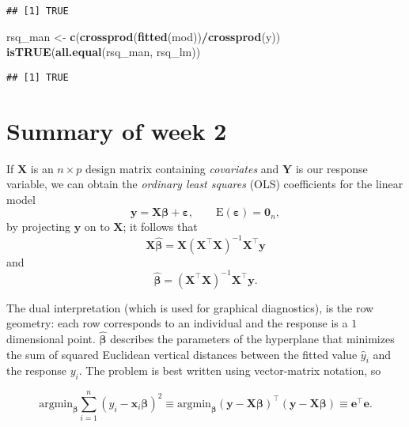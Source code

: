 \documentclass[]{book}
\newenvironment{Shaded}{\begin{snugshade}}{\end{snugshade}}
\newcommand{\KeywordTok}[1]{\textcolor[rgb]{0.13,0.29,0.53}{\textbf{#1}}}
\newcommand{\NormalTok}[1]{#1}
\newcommand{\OperatorTok}[1]{\textcolor[rgb]{0.81,0.36,0.00}{\textbf{#1}}}
\newcommand{\StringTok}[1]{\textcolor[rgb]{0.31,0.60,0.02}{#1}}
\theoremstyle{definition}
\theoremstyle{definition}
\theoremstyle{definition}
\theoremstyle{remark}
\begin{document}
\begin{verbatim}
## [1] TRUE
\end{verbatim}

\begin{Shaded}
\begin{Highlighting}[]
\NormalTok{rsq_man <-}\StringTok{ }\KeywordTok{c}\NormalTok{(}\KeywordTok{crossprod}\NormalTok{(}\KeywordTok{fitted}\NormalTok{(mod))}\OperatorTok{/}\KeywordTok{crossprod}\NormalTok{(y))}
\KeywordTok{isTRUE}\NormalTok{(}\KeywordTok{all.equal}\NormalTok{(rsq_man, rsq_lm))}
\end{Highlighting}
\end{Shaded}

\begin{verbatim}
## [1] TRUE
\end{verbatim}

\hypertarget{summary-of-week-2}{%
\section{Summary of week 2}\label{summary-of-week-2}}

If \(\mathbf{X}\) is an \(n \times p\) design matrix containing \emph{covariates} and \(\boldsymbol{Y}\) is our response variable, we can obtain the \emph{ordinary least squares} (OLS) coefficients for the linear model
\[\boldsymbol{y} = \mathbf{X}\boldsymbol{\beta}+ \boldsymbol{\varepsilon}, \qquad \mathrm{E}(\boldsymbol{\varepsilon})=\boldsymbol{0}_n,\]
by projecting \(\boldsymbol{y}\) on to \(\mathbf{X}\); it follows that
\[\mathbf{X}\hat{\boldsymbol{\beta}}=\mathbf{X}(\mathbf{X}^\top\mathbf{X})^{-1}\mathbf{X}^\top{\boldsymbol{y}}\] and
\[\hat{\boldsymbol{\beta}} = (\mathbf{X}^\top\mathbf{X})^{-1}\mathbf{X}^\top{\boldsymbol{y}}.\]

The dual interpretation (which is used for graphical diagnostics), is the row geometry: each row corresponds to an individual and the response is a \(1\) dimensional point.
\(\hat{\boldsymbol{\beta}}\) describes the parameters of the hyperplane that minimizes the sum of squared Euclidean vertical distances between the fitted value \(\hat{y}_i\) and the response \(y_i\).
The problem is best written using vector-matrix notation, so

\[ \mathrm{argmin}_{\boldsymbol{\beta}} \sum_{i=1}^n (y_i- \mathbf{x}_i\boldsymbol{\beta})^2 \equiv \mathrm{argmin}_{\boldsymbol{\beta}} (\boldsymbol{y} - \mathbf{X}\boldsymbol{\beta})^\top(\boldsymbol{y}-\mathbf{X}\boldsymbol{\beta}) \equiv \boldsymbol{e}^\top\boldsymbol{e}.
\]
\end{document}
